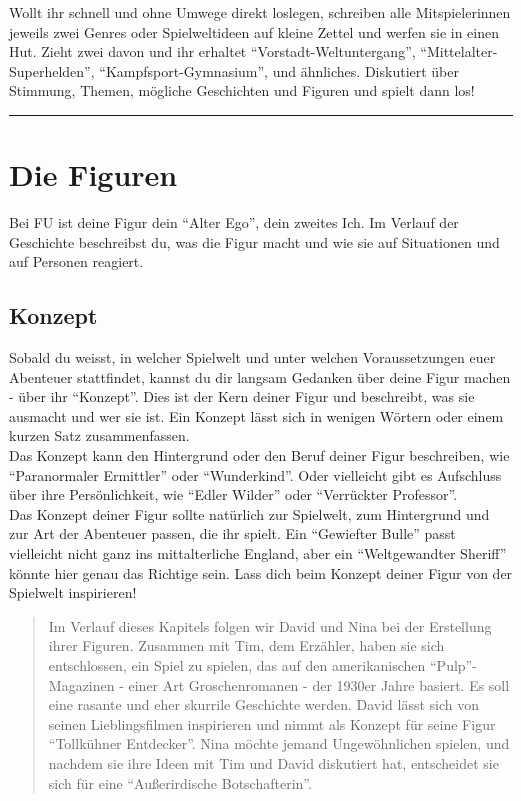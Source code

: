 \documentclass[]{article}
\begin{document}
Wollt ihr schnell und ohne Umwege direkt loslegen, schreiben alle
Mitspielerinnen jeweils zwei Genres oder Spielweltideen auf kleine
Zettel und werfen sie in einen Hut. Zieht zwei davon und ihr erhaltet
``Vorstadt-Weltuntergang'', ``Mittelalter-Superhelden'',
``Kampfsport-Gymnasium'', und ähnliches. Diskutiert über Stimmung,
Themen, mögliche Geschichten und Figuren und spielt dann los!

\columnsend

\begin{center}\rule{0.5\linewidth}{\linethickness}\end{center}

\section{Die Figuren}\label{die-figuren}

Bei FU ist deine Figur dein ``Alter Ego'', dein zweites Ich. Im Verlauf
der Geschichte beschreibst du, was die Figur macht und wie sie auf
Situationen und auf Personen reagiert.

\subsection{Konzept}\label{konzept}

Sobald du weisst, in welcher Spielwelt und unter welchen Voraussetzungen
euer Abenteuer stattfindet, kannst du dir langsam Gedanken über deine
Figur machen - über ihr ``Konzept''. Dies ist der Kern deiner Figur und
beschreibt, was sie ausmacht und wer sie ist. Ein Konzept lässt sich in
wenigen Wörtern oder einem kurzen Satz zusammenfassen.\\
Das Konzept kann den Hintergrund oder den Beruf deiner Figur
beschreiben, wie ``Paranormaler Ermittler'' oder ``Wunderkind''. Oder
vielleicht gibt es Aufschluss über ihre Persönlichkeit, wie ``Edler
Wilder'' oder ``Verrückter Professor''.\\
Das Konzept deiner Figur sollte natürlich zur Spielwelt, zum Hintergrund
und zur Art der Abenteuer passen, die ihr spielt. Ein ``Gewiefter
Bulle'' passt vielleicht nicht ganz ins mittalterliche England, aber ein
``Weltgewandter Sheriff'' könnte hier genau das Richtige sein. Lass dich
beim Konzept deiner Figur von der Spielwelt inspirieren!

\begin{quote}
Im Verlauf dieses Kapitels folgen wir David und Nina bei der Erstellung
ihrer Figuren. Zusammen mit Tim, dem Erzähler, haben sie sich
entschlossen, ein Spiel zu spielen, das auf den amerikanischen
``Pulp''-Magazinen - einer Art Groschenromanen - der 1930er Jahre
basiert. Es soll eine rasante und eher skurrile Geschichte werden. David
lässt sich von seinen Lieblingsfilmen inspirieren und nimmt als Konzept
für seine Figur ``Tollkühner Entdecker''. Nina möchte jemand
Ungewöhnlichen spielen, und nachdem sie ihre Ideen mit Tim und David
diskutiert hat, entscheidet sie sich für eine ``Außerirdische
Botschafterin''.
\end{quote}
\end{document}
